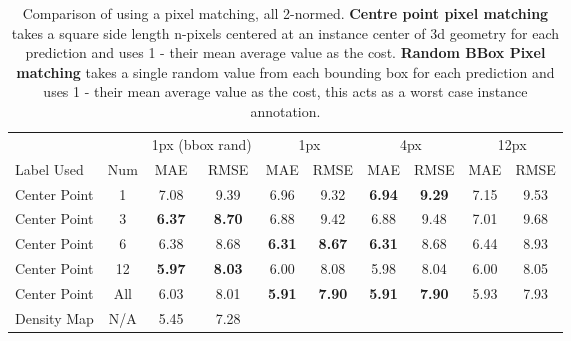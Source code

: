 \documentclass[../confirmation.tex]{subfiles}
\begin{document}
\begin{table}
	\centering
 \begin{tabular}{lccccccccc}
 \toprule
 
 & & \multicolumn{2}{c}{1px (bbox rand)} & \multicolumn{2}{c}{1px} & \multicolumn{2}{c}{4px} & \multicolumn{2}{c}{12px} \\ 
 Label Used & Num & MAE & RMSE & MAE & RMSE & MAE & RMSE & MAE & RMSE \\ 
 \midrule
 Center Point & 1 & 7.08 & 9.39 & 6.96 & 9.32 & \textbf{6.94} & \textbf{9.29} & 7.15 & 9.53 \\
 Center Point & 3 & \textbf{6.37} & \textbf{8.70} & 6.88 & 9.42 & 6.88 & 9.48 & 7.01 & 9.68 \\
 Center Point & 6 & 6.38 & 8.68 & \textbf{6.31} & \textbf{8.67} & \textbf{6.31} & 8.68 & 6.44 & 8.93 \\
 Center Point & 12 & \textbf{5.97} & \textbf{8.03} & 6.00 & 8.08 & 5.98 & 8.04 & 6.00 & 8.05 \\
 Center Point & All & 6.03 & 8.01 & \textbf{5.91} & \textbf{7.90} & \textbf{5.91} & \textbf{7.90} & 5.93 & 7.93 \\
 \midrule
 Density Map & N/A & 5.45 & 7.28 \\

 \bottomrule
 \end{tabular}
	\caption{Comparison of using a pixel matching, all 2-normed.
 \textbf{Centre point pixel matching} takes a square side length n-pixels centered at an instance center of 3d geometry for each prediction and uses 1 - their mean average value as the cost. 
 \textbf{Random BBox Pixel matching} takes a single random value from each bounding box for each prediction and uses 1 - their mean average value as the cost, this acts as a worst case instance annotation.}
	\label{tab:centers_matching}
\end{table}
\end{document}
